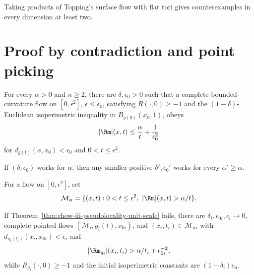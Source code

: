 \begin{remark}
\label{rem:chow-iii-topping-products}
Taking products of Topping's surface flow with flat tori gives counterexamples
in every dimension at least two.
\end{remark}

\section{Proof by contradiction and point picking}

\begin{theorem}[\(r_0=1\) case of pseudolocality]
\label{thm:chow-iii-pseudolocality-unit-scale}
For every \(\alpha>0\) and \(n\ge2\), there are \(\delta,\epsilon_0>0\) such
that a complete bounded-curvature flow on \([0,\epsilon^2]\), \(\epsilon\le
\epsilon_0\), satisfying \(R(\cdot,0)\ge-1\) and the \((1-\delta)\)-Euclidean
isoperimetric inequality in \(B_{g(0)}(x_0,1)\), obeys
\[
|\Rm|(x,t)\le\frac\alpha t+\frac1{\epsilon_0^2}
\]
for \(d_{g(t)}(x,x_0)<\epsilon_0\) and \(0<t\le\epsilon^2\).
\end{theorem}

\begin{remark}
\label{rem:chow-iii-pseudolocality-parameter-monotonicity}
If \((\delta,\epsilon_0)\) works for \(\alpha\), then any smaller positive
\(\delta',\epsilon_0'\) works for every \(\alpha'\ge\alpha\).
\end{remark}

\begin{definition}
\label{def:chow-iii-alpha-large-curvature}
For a flow on \([0,\epsilon^2]\), set
\[
\mathcal M_\alpha=\{(x,t):0<t\le\epsilon^2,\ |\Rm|(x,t)>\alpha/t\}.
\]
\end{definition}

\begin{theorem}
\label{ctr:chow-iii-pseudolocality-counterstatement}
If Theorem~\ref{thm:chow-iii-pseudolocality-unit-scale} fails, there are
\(\delta_i,\epsilon_{0i},\epsilon_i\to0\), complete pointed flows
\((\mathcal M_i,g_i(t),x_{0i})\), and \((x_i,t_i)\in\mathcal M_{i\alpha}\) with
\(d_{g_i(t_i)}(x_i,x_{0i})<\epsilon_i\) and
\[
|\Rm_{g_i}|(x_i,t_i)>\alpha/t_i+\epsilon_{0i}^{-2},
\]
while \(R_{g_i}(\cdot,0)\ge-1\) and the initial isoperimetric constants are
\((1-\delta_i)c_n\).
\end{theorem}

